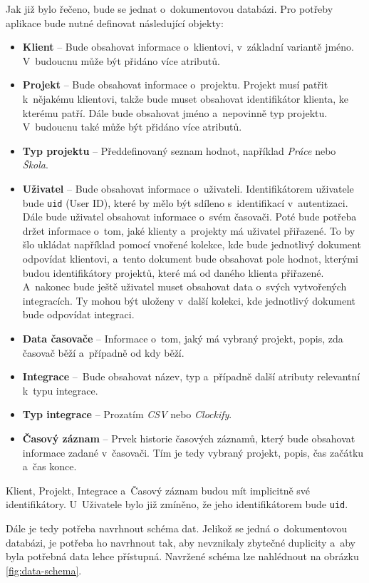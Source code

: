 Jak již bylo řečeno, bude se jednat o~dokumentovou databázi. Pro potřeby aplikace bude nutné definovat následující objekty:
\begin{itemize}
\item\textbf{Klient} – Bude obsahovat informace o~klientovi, v~základní variantě jméno. V~budoucnu může být přidáno více atributů.
\item\textbf{Projekt} – Bude obsahovat informace o~projektu. Projekt musí patřit k~nějakému klientovi, takže bude muset obsahovat identifikátor klienta, ke kterému patří. Dále bude obsahovat jméno a~nepovinně typ projektu. V~budoucnu také může být přidáno více atributů.
\item\textbf{Typ projektu} – Předdefinovaný seznam hodnot, například \emph{Práce} nebo \emph{Škola}.
\item\textbf{Uživatel} – Bude obsahovat informace o~uživateli. Identifikátorem uživatele bude \texttt{uid} (User ID), které by mělo být sdíleno s~identifikací v~autentizaci. Dále bude uživatel obsahovat informace o~svém časovači. Poté bude potřeba držet informace o~tom, jaké klienty a~projekty má uživatel přiřazené. To by šlo ukládat například pomocí vnořené kolekce, kde bude jednotlivý dokument odpovídat klientovi, a~tento dokument bude obsahovat pole hodnot, kterými budou identifikátory projektů, které má od daného klienta přiřazené. A~nakonec bude ještě uživatel muset obsahovat data o~svých vytvořených integracích. Ty mohou být uloženy v~další kolekci, kde jednotlivý dokument bude odpovídat integraci.
\item\textbf{Data časovače} – Informace o~tom, jaký má vybraný projekt, popis, zda časovač běží a~případně od kdy běží.
\item\textbf{Integrace} – Bude obsahovat název, typ a~případně další atributy relevantní k~typu integrace.
\item\textbf{Typ integrace} – Prozatím \emph{CSV} nebo \emph{Clockify}.
\item\textbf{Časový záznam} – Prvek historie časových záznamů, který bude obsahovat informace zadané v~časovači. Tím je tedy vybraný projekt, popis, čas začátku a~čas konce.
\end{itemize}
Klient, Projekt, Integrace a~Časový záznam budou mít implicitně své identifikátory. U~Uživatele bylo již zmíněno, že jeho identifikátorem bude \texttt{uid}.

Dále je tedy potřeba navrhnout schéma dat. Jelikož se jedná o~dokumentovou databázi, je potřeba ho navrhnout tak, aby nevznikaly zbytečné duplicity a~aby byla potřebná data lehce přístupná. Navržené schéma lze nahlédnout na obrázku \ref{fig:data-schema}. 

